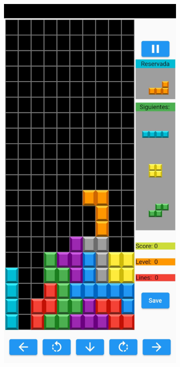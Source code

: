 \documentclass{article}
\begin{document}
\begin{figure}[H]
  \begin{subfigure}{0.5\textwidth}
          \includegraphics[width=\textwidth]{imagenes/captura1.jpeg}

\end{subfigure}
\end{figure}
\end{document}
